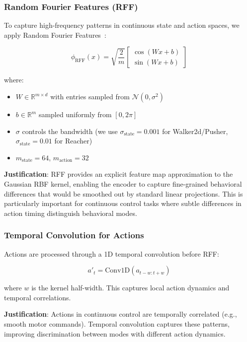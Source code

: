 \documentclass{article}
\begin{document}
\subsubsection{Random Fourier Features (RFF)}

To capture high-frequency patterns in continuous state and action spaces, we apply Random Fourier Features~\cite{rahimi2007random}:

\begin{equation}
    \phi_{\text{RFF}}(x) = \sqrt{\frac{2}{m}} \begin{bmatrix} \cos(Wx + b) \\ \sin(Wx + b) \end{bmatrix}
\end{equation}

where:
\begin{itemize}
    \item $W \in \mathbb{R}^{m \times d}$ with entries sampled from $\mathcal{N}(0, \sigma^2)$
    \item $b \in \mathbb{R}^{m}$ sampled uniformly from $[0, 2\pi]$
    \item $\sigma$ controls the bandwidth (we use $\sigma_{\text{state}} = 0.001$ for Walker2d/Pusher, $\sigma_{\text{state}} = 0.01$ for Reacher)
    \item $m_{\text{state}} = 64$, $m_{\text{action}} = 32$
\end{itemize}

\textbf{Justification}: RFF provides an explicit feature map approximation to the Gaussian RBF kernel, enabling the encoder to capture fine-grained behavioral differences that would be smoothed out by standard linear projections. This is particularly important for continuous control tasks where subtle differences in action timing distinguish behavioral modes.

\subsubsection{Temporal Convolution for Actions}

Actions are processed through a 1D temporal convolution before RFF:

\begin{equation}
    a'_t = \text{Conv1D}(a_{t-w:t+w})
\end{equation}

where $w$ is the kernel half-width. This captures local action dynamics and temporal correlations.

\textbf{Justification}: Actions in continuous control are temporally correlated (e.g., smooth motor commands). Temporal convolution captures these patterns, improving discrimination between modes with different action dynamics.
\end{document}
